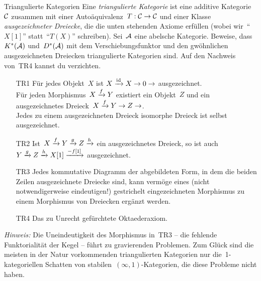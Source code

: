 \documentclass{uebblatt}
\begin{document}
\begin{aufgabe}{Triangulierte Kategorien}
Eine \emph{triangulierte Kategorie} ist eine additive Kategorie~$\mathcal{C}$ zusammen
mit einer Autoäquivalenz~$T : \mathcal{C} \to \mathcal{C}$ und einer Klasse \emph{ausgezeichneter
Dreiecke}, die die unten stehenden Axiome erfüllen (wobei wir~"`$X[1]$"' statt~"`$T(X)$"'
schreiben). Sei~$\mathcal{A}$ eine abelsche Kategorie. Beweise, dass~$K^*(\mathcal{A})$ und~$D^*(\mathcal{A})$
mit dem Verschiebungsfunktor und den gwöhnlichen ausgezeichneten Dreiecken
triangulierte Kategorien sind. Auf den Nachweis von~TR4 kannst du
verzichten.\par
\begin{scriptsize}
\begin{itemize}
\item[TR1] Für jedes Objekt~$X$ ist $X \xrightarrow{\mathrm{id}} X \to 0 \to$
ausgezeichnet.\\[-1.3em]

Für jeden Morphismus~$X \xrightarrow{f} Y$ existiert ein Objekt~$Z$ und ein
ausgezeichnetes Dreieck~$X \xrightarrow{f} Y \to Z \to$.\\[-1.3em]

Jedes zu einem ausgezeichneten Dreieck isomorphe Dreieck ist selbst
ausgezeichnet.

\item[TR2] Ist~$X \xrightarrow{f} Y \xrightarrow{g} Z \xrightarrow{h}$ ein ausgezeichnetes Dreieck, so
ist auch $Y \xrightarrow{g} Z \xrightarrow{h} X[1] \xrightarrow{-f[1]}$ ausgezeichnet.

\item[TR3] Jedes kommutative Diagramm der abgebildeten Form, in dem die beiden Zeilen
ausgezeichnete Dreiecke sind, kann vermöge eines (nicht notwendigerweise
eindeutigen!) gestrichelt eingezeichneten Morphismus zu einem Morphismus von
Dreiecken ergänzt werden.

\item[TR4] Das zu Unrecht gefürchtete Oktaederaxiom.
\end{itemize}
\end{scriptsize}

\begin{minipage}{0.8\textwidth}{\tiny\emph{Hinweis:} Die Uneindeutigkeit des Morphismus in~TR3 -- die fehlende
Funktorialität der Kegel -- führt zu gravierenden Problemen. Zum Glück sind die
meisten in der Natur vorkommenden triangulierten Kategorien nur
die~1-kategoriellen Schatten von stabilen~$(\infty,1)$-Kategorien, die diese
Probleme nicht haben.\par}\end{minipage}
\end{aufgabe}
\end{document}
